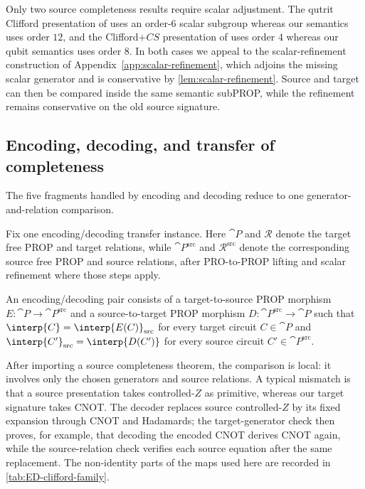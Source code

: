 Only two source completeness results require scalar adjustment.  The qutrit Clifford presentation of
\cite{qutritclifford} uses an order-\(6\) scalar subgroup whereas our semantics uses order \(12\), and
the Clifford\(+CS\) presentation of \cite{SelingerCliffordPlusCS} uses order \(4\) whereas our qubit
semantics uses order \(8\).  In both cases we appeal to the scalar-refinement construction of
Appendix~\ref{app:scalar-refinement}, which adjoins the missing scalar generator and is conservative
by \cref{lem:scalar-refinement}.  Source and target can then be compared inside the same semantic
subPROP, while the refinement remains conservative on the old source signature.

\subsection{Encoding, decoding, and transfer of completeness}

The five fragments handled by encoding and decoding reduce to one generator-and-relation
comparison.

Fix one encoding/decoding transfer instance.  Here \(\cat{P}\) and \(\mathcal{R}\) denote the
target free PROP and target relations, while \(\cat{P}^{\mathrm{src}}\) and
\(\mathcal{R}^{\mathrm{src}}\) denote the corresponding source free PROP and source relations,
after PRO-to-PROP lifting and scalar refinement where those steps apply.

\begin{definition}\label{def:encdec}
An encoding/decoding pair consists of a target-to-source PROP morphism
\(E:\cat{P}\to\cat{P}^{\mathrm{src}}\) and a source-to-target PROP morphism
\(D:\cat{P}^{\mathrm{src}}\to\cat{P}\) such that
\(\interp{C}=\interp{E(C)}_{\mathrm{src}}\) for every target circuit \(C\in\cat{P}\) and
\(\interp{C'}_{\mathrm{src}}=\interp{D(C')}\) for every source circuit
\(C'\in\cat{P}^{\mathrm{src}}\).
\end{definition}

After importing a source completeness theorem, the comparison is local: it involves only the chosen
generators and source relations.  A typical mismatch is that a source presentation takes
controlled-\(Z\) as primitive, whereas our target signature takes CNOT.  The decoder replaces source
controlled-\(Z\) by its fixed expansion through CNOT and Hadamards; the target-generator check then
proves, for example, that decoding the encoded CNOT derives CNOT again, while the source-relation
check verifies each source equation after the same replacement.  The non-identity parts of the maps
used here are recorded in \cref{tab:ED-clifford-family}.

